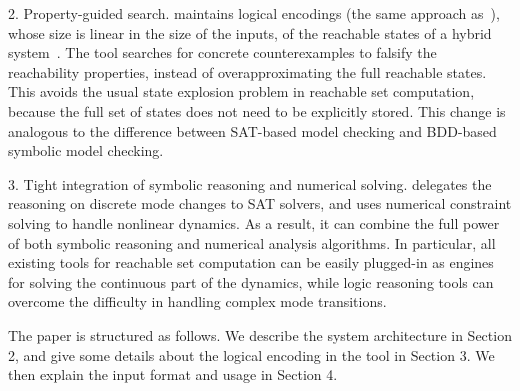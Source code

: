 2. Property-guided search. \dReach{} maintains logical encodings (the
same approach as~\cite{DBLP:conf/aaai/CimattiMT12}), whose size is
linear in the size of the inputs, of the reachable states of a hybrid system~\cite{DBLP:journals/corr/GaoKCC14}. The tool searches for concrete counterexamples to falsify the reachability properties, instead of overapproximating the full reachable states.
This avoids the usual state explosion problem in reachable set computation, because the full set of states does not need to be explicitly stored. This change
is analogous to the difference between SAT-based model checking and BDD-based symbolic model checking.

3. Tight integration of symbolic reasoning and numerical solving. \dReach{} delegates the
reasoning on discrete mode changes to SAT solvers, and uses numerical constraint solving to handle nonlinear dynamics.
As a result, it can combine the full power of both symbolic reasoning and numerical analysis algorithms. In particular,
all existing tools for reachable set computation can be easily plugged-in as engines for solving
the continuous part of the dynamics, while logic reasoning tools can overcome the difficulty
in handling complex mode transitions.

The paper is structured as follows. We describe the system architecture in Section 2,
and give some details about the logical encoding in the tool in Section 3.
We then explain the input format and usage in Section 4. %



